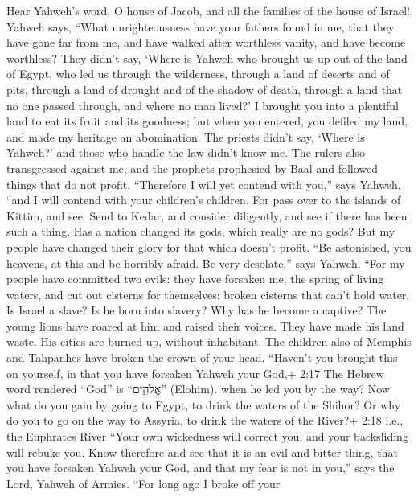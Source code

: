  Hear Yahweh's word, O house of Jacob, and all the families
of the house of Israel!  Yahweh says, ``What unrighteousness
have your fathers found in me, that they have gone far from me, and have
walked after worthless vanity, and have become worthless? 
They didn't say, `Where is Yahweh who brought us up out of the land of
Egypt, who led us through the wilderness, through a land of deserts and
of pits, through a land of drought and of the shadow of death, through a
land that no one passed through, and where no man lived?'  I
brought you into a plentiful land to eat its fruit and its goodness; but
when you entered, you defiled my land, and made my heritage an
abomination.  The priests didn't say, `Where is Yahweh?' and
those who handle the law didn't know me. The rulers also transgressed
against me, and the prophets prophesied by Baal and followed things that
do not profit.  ``Therefore I will yet contend with you,''
says Yahweh, ``and I will contend with your children's children.
 For pass over to the islands of Kittim, and see. Send to
Kedar, and consider diligently, and see if there has been such a thing.
 Has a nation changed its gods, which really are no gods?
But my people have changed their glory for that which doesn't profit.
 ``Be astonished, you heavens, at this and be horribly
afraid. Be very desolate,'' says Yahweh.  ``For my people
have committed two evils: they have forsaken me, the spring of living
waters, and cut out cisterns for themselves: broken cisterns that can't
hold water.  Is Israel a slave? Is he born into slavery?
Why has he become a captive?  The young lions have roared
at him and raised their voices. They have made his land waste. His
cities are burned up, without inhabitant.  The children
also of Memphis and Tahpanhes have broken the crown of your head.
 ``Haven't you brought this on yourself, in that you have
forsaken Yahweh your God,+ 2:17 The Hebrew word rendered ``God'' is
``אֱלֹהִ֑ים'' (Elohim). when he led you by the way?  Now
what do you gain by going to Egypt, to drink the waters of the Shihor?
Or why do you to go on the way to Assyria, to drink the waters of the
River?+ 2:18 i.e., the Euphrates River  ``Your own
wickedness will correct you, and your backsliding will rebuke you. Know
therefore and see that it is an evil and bitter thing, that you have
forsaken Yahweh your God, and that my fear is not in you,'' says the
Lord, Yahweh of Armies.  ``For long ago I broke off your
